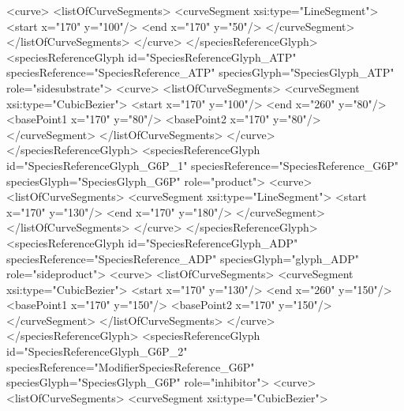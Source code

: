 \begin{example}
                <curve>
                  <listOfCurveSegments>
                    <curveSegment xsi:type="LineSegment">
                      <start x="170" y="100"/>
                      <end x="170" y="50"/>
                    </curveSegment>
                  </listOfCurveSegments>
                </curve>
              </speciesReferenceGlyph>
              <speciesReferenceGlyph id="SpeciesReferenceGlyph_ATP" 
                            speciesReference="SpeciesReference_ATP"
                            speciesGlyph="SpeciesGlyph_ATP" role="sidesubstrate">
                <curve>
                  <listOfCurveSegments>
                    <curveSegment xsi:type="CubicBezier">
                      <start x="170" y="100"/>
                      <end x="260" y="80"/>
                      <basePoint1 x="170" y="80"/>
                      <basePoint2 x="170" y="80"/>
                    </curveSegment>
                  </listOfCurveSegments>
                </curve>
              </speciesReferenceGlyph>
              <speciesReferenceGlyph id="SpeciesReferenceGlyph_G6P_1"
                              speciesReference="SpeciesReference_G6P"
                              speciesGlyph="SpeciesGlyph_G6P" role="product">
                <curve>
                  <listOfCurveSegments>
                    <curveSegment xsi:type="LineSegment">
                      <start x="170" y="130"/>
                      <end x="170" y="180"/>
                    </curveSegment>
                  </listOfCurveSegments>
                </curve>
              </speciesReferenceGlyph>
              <speciesReferenceGlyph id="SpeciesReferenceGlyph_ADP"
                            speciesReference="SpeciesReference_ADP"
                            speciesGlyph="glyph_ADP" role="sideproduct">
                <curve>
                  <listOfCurveSegments>
                    <curveSegment xsi:type="CubicBezier">
                      <start x="170" y="130"/>
                      <end x="260" y="150"/>
                      <basePoint1 x="170" y="150"/>
                      <basePoint2 x="170" y="150"/>
                    </curveSegment>
                  </listOfCurveSegments>
                </curve>
              </speciesReferenceGlyph>
              <speciesReferenceGlyph id="SpeciesReferenceGlyph_G6P_2"
                      speciesReference="ModifierSpeciesReference_G6P"
                      speciesGlyph="SpeciesGlyph_G6P" role="inhibitor">
                <curve>
                  <listOfCurveSegments>
                    <curveSegment xsi:type="CubicBezier">

\end{example}
